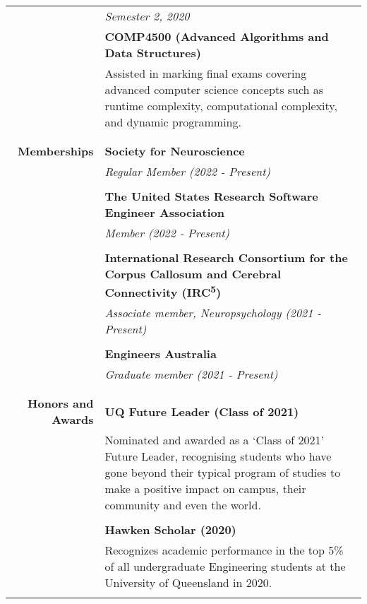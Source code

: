 \documentclass{article}
\begin{document}
\begin{longtable}{>{\columncolor{LeftColumn}}r | p{13cm}}
											& \textit{Semester 2, 2020} \\
											& \textbf{COMP4500 (Advanced Algorithms and Data Structures)} \\
											& Assisted in marking final exams covering advanced computer science concepts such as runtime complexity, computational complexity, and dynamic programming. \\
											& \\
											\hline

											\pagebreak

											\hline \\

		\large\textbf{Memberships} 	  		& \large\textbf{Society for Neuroscience} \\
											& \textit{Regular Member (2022 - Present)} \\
											& \\
		
											& \large\textbf{The United States Research Software Engineer Association} \\
											& \textit{Member (2022 - Present)} \\
											& \\
		
											& \large\textbf{International Research Consortium for the Corpus Callosum and Cerebral Connectivity (IRC\textsuperscript{5})} \\
											& \textit{Associate member, Neuropsychology (2021 - Present)} \\ 
											& \\

											& \large\textbf{Engineers Australia} \\
											& \textit{Graduate member (2021 - Present)} \\
											& \\
											\hline \\

		\large\textbf{Honors and Awards}	& \large\textbf{UQ Future Leader (Class of 2021)} \\
											& Nominated and awarded as a `Class of 2021' Future Leader, recognising students who have gone beyond their typical program of studies to make a positive impact on campus, their community and even the world.  \\
											& \\

											& \large\textbf{Hawken Scholar (2020)} \\
											& Recognizes academic performance in the top 5\% of all undergraduate Engineering students at the University of Queensland in 2020. \\
											& \\
											

\end{longtable}
\end{document}

